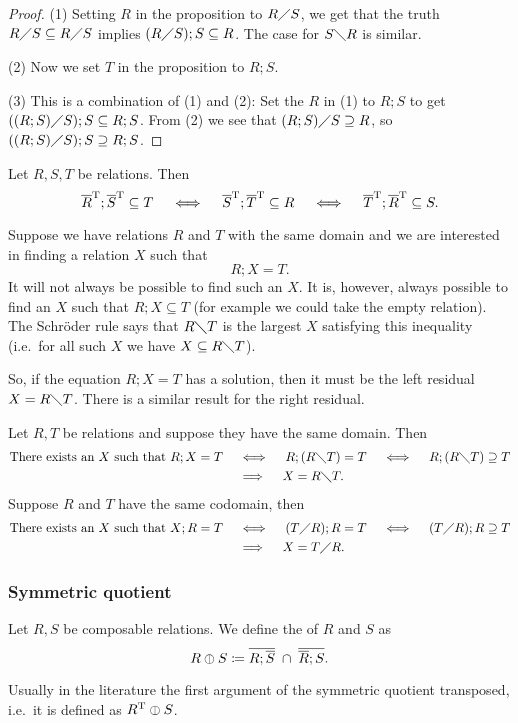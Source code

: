 \begin{proof}
(1) Setting $R$ in the proposition to $R\diagup S$, we get that the truth $R\diagup S \subseteq R\diagup S$ implies $(R\diagup S);S \subseteq R$. The case for $S\diagdown R$ is similar.

(2) Now we set $T$ in the proposition to $R;S$.

(3) This is a combination of (1) and (2): Set the $R$ in (1) to $R;S$ to get $((R;S)\diagup S);S \subseteq R;S$. From (2) we see that $(R;S)\diagup S \supseteq R$, so $((R;S)\diagup S);S \supseteq R;S$.
\end{proof}
\begin{corollary}
Let $R,S,T$ be relations. Then
\[ \overline{R}^{\mathrm{T}};\overline{S}^{\mathrm{T}} \subseteq T \quad\iff\quad \overline{S}^{\mathrm{T}};\overline{T}^{\mathrm{T}} \subseteq R \quad\iff\quad \overline{T}^{\mathrm{T}};\overline{R}^{\mathrm{T}} \subseteq S. \]
\end{corollary}

Suppose we have relations $R$ and $T$ with the same domain and we are interested in finding a relation $X$ such that
\[ R;X = T. \]
It will not always be possible to find such an $X$. It is, however, always possible to find an $X$ such that $R;X \subseteq T$ (for example we could take the empty relation). The Schröder rule says that $R\diagdown T$ is the largest $X$ satisfying this inequality (i.e.\ for all such $X$ we have $X\subseteq R\diagdown T$).

So, if the equation $R;X = T$ has a solution, then it must be the left residual $X = R\diagdown T$. There is a similar result for the right residual.

\begin{corollary}
Let $R,T$ be relations and suppose they have the same domain. Then
\begin{align*}
\text{There exists an $X$ such that $R;X = T$} \quad&\iff\quad R;(R\diagdown T) = T \quad\iff\quad R;(R\diagdown T) \supseteq T \\
&\implies\quad X = R\diagdown T.
\end{align*}
Suppose $R$ and $T$ have the same codomain, then
\begin{align*}
\text{There exists an $X$ such that $X;R = T$} \quad&\iff\quad (T\diagup R);R = T \quad\iff\quad (T\diagup R);R \supseteq T \\
&\implies\quad X = T\diagup R.
\end{align*}
\end{corollary}

\subsubsection{Symmetric quotient}
\begin{definition}
Let $R,S$ be composable relations. We define the  of $R$ and $S$ as
\[ R \mathbin{\obar} S \coloneqq \overline{R;\overline{S}} \;\cap\; \overline{\overline{R};S}. \]
\end{definition}
Usually in the literature the first argument of the symmetric quotient transposed, i.e.\ it is defined as $R^{\mathrm{T}} \mathbin{\obar} S$.

